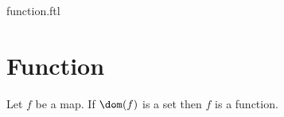 \documentclass{naproche-library}
\begin{document}
\begin{smodule}{function.ftl}

  \section{Function}

  \begin{axiom}[forthel,title=Function Axiom,id=FOUNDATIONS_10_7781693549182976]
    Let $f$ be a map.
    If $\dom(f)$ is a set then $f$ is a function.
  \end{axiom}
\end{smodule}
\end{document}
